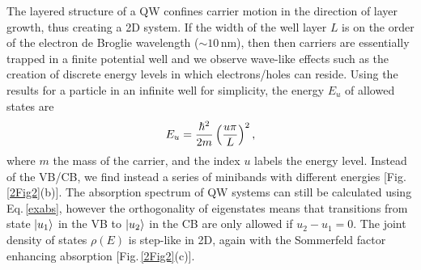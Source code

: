 The layered structure of a QW confines carrier motion in the direction of layer growth, thus creating a 2D system. If the width of the well layer $L$ is on the order of the electron de Broglie wavelength ($\sim10$\,nm), then then carriers are essentially trapped in a finite potential well and we observe wave-like effects such as the creation of discrete energy levels in which electrons/holes can reside. Using the results for a particle in an infinite well for simplicity, the energy $E_u$ of allowed states are
\begin{equation}
\centering
E_u = \frac{\hbar^2}{2m} \left(\frac{u\pi}{L}\right)^2 ,
\label{particleboxenergy}
\end{equation}
where $m$ the mass of the carrier, and the index $u$ labels the energy level. Instead of the VB/CB, we find instead a series of minibands with different energies [Fig.\,\ref{2Fig2}(b)]. The absorption spectrum of QW systems can still be calculated using Eq.\,\ref{exabs}, however the orthogonality of eigenstates means that transitions from state $\Ket{u_1}$ in the VB to $\Ket{u_2}$ in the CB are only allowed if $u_2-u_1=0$. The joint density of states $\rho(E)$ is step-like in 2D, again with the Sommerfeld factor enhancing absorption [Fig.\,\ref{2Fig2}(c)].
